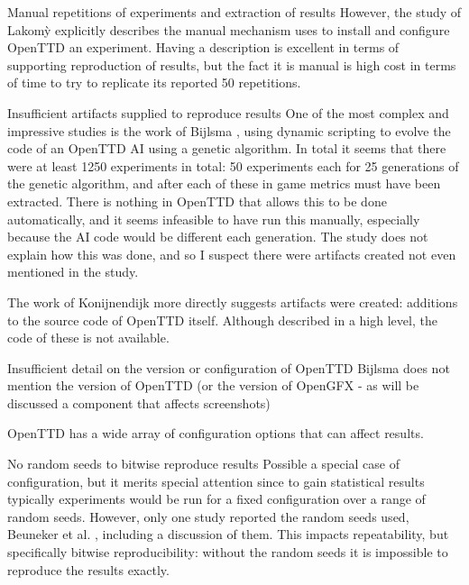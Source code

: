 \documentclass[logo,msc,dsti]{infthesis}    %
\begin{document}
{\begin{enumerate}
\begin{descitem}{Manual repetitions of experiments and extraction of results}
However, the study of {Lakom{\`y}} \cite{lakomy2020railroad} explicitly describes the manual mechanism uses to install and configure OpenTTD an experiment. Having a description is excellent in terms of supporting reproduction of results, but the fact it is manual is high cost in terms of time to try to replicate its reported 50 repetitions.
\end{descitem}
\begin{descitem}{Insufficient artifacts supplied to reproduce results}
One of the most complex and impressive studies is the work of Bijlsma \cite{bijlsma2014evolving}, using dynamic scripting to evolve the code of an OpenTTD AI using a genetic algorithm. In total it seems that there were at least 1250 experiments in total: 50 experiments each for 25 generations of the genetic algorithm, and after each of these in game metrics must have been extracted. There is nothing in OpenTTD that allows this to be done automatically, and it seems infeasible to have run this manually, especially because the AI code would be different each generation. The study does not explain how this was done, and so I suspect there were artifacts created not even mentioned in the study.

The work of Konijnendijk \cite{konijnendijk2015mcts} more directly suggests artifacts were created: additions to the source code of OpenTTD itself. Although described in a high level, the code of these is not available.
\end{descitem}

\begin{descitem}{Insufficient detail on the version or configuration of OpenTTD}
Bijlsma \cite{bijlsma2014evolving} does not mention the version of OpenTTD (or the version of OpenGFX - as will be discussed a component that affects screenshots)

OpenTTD has a wide array of configuration options that can affect results.
\end{descitem}
\begin{descitem}{No random seeds to bitwise reproduce results}
Possible a special case of configuration, but it merits special attention since to gain statistical results typically experiments would be run for a fixed configuration over a range of random seeds. However, only one study reported the random seeds used, Beuneker et al. \cite{beuneker2019autonomous}, including a discussion of them. This impacts repeatability, but specifically bitwise reproducibility: without the random seeds it is impossible to reproduce the results exactly.
\end{descitem}


\end{enumerate}}
\end{document}
